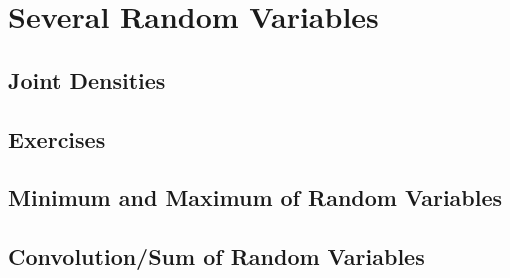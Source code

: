 \section{Several Random Variables}

\subsection{Joint Densities}

\subsection{Exercises}

\subsection{Minimum and Maximum of Random Variables}

\subsection{Convolution/Sum of Random Variables}